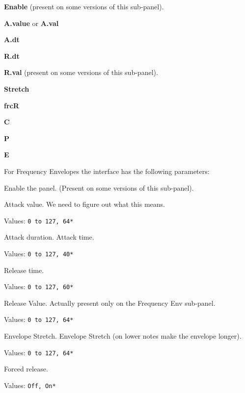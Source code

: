    \begin{enumber}
      \item \textbf{Enable} (present on some versions of this sub-panel).
      \item \textbf{A.value} or \textbf{A.val}
      \item \textbf{A.dt}
      \item \textbf{R.dt}
      \item \textbf{R.val} (present on some versions of this sub-panel).
      \item \textbf{Stretch}
      \item \textbf{frcR}
      \item \textbf{C}
      \item \textbf{P}
      \item \textbf{E}
   \end{enumber}

   For Frequency Envelopes the interface has the following parameters:

   \setcounter{ItemCounter}{0}      %

   Enable the panel.  (Present on some versions of this sub-panel).


   Attack value.
   We need to figure out what this means.

   Values: \texttt{0 to 127, 64*}

   Attack duration. Attack time.

   Values: \texttt{0 to 127, 40*}

   Release time.

   Values: \texttt{0 to 127, 60*}

   Release Value.
   Actually present only on the Frequency Env sub-panel.

   Values: \texttt{0 to 127, 64*}

   Envelope Stretch.
   Envelope Stretch (on lower notes make the envelope longer).

   Values: \texttt{0 to 127, 64*}

   Forced release.

   Values: \texttt{Off, On*}

